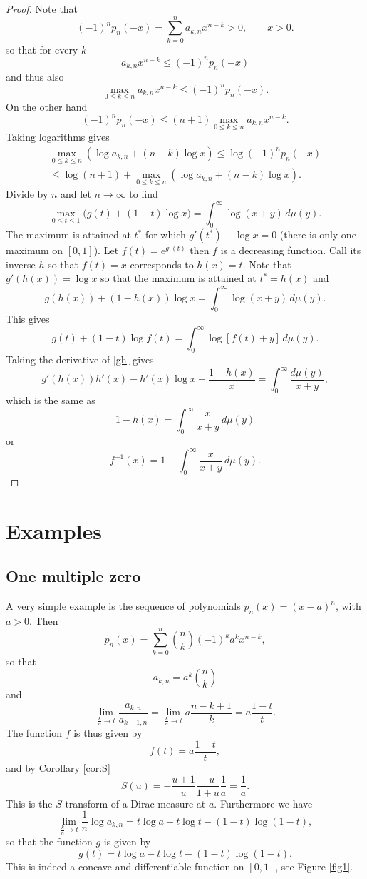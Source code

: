 \documentclass[12pt]{article}
\numberwithin{equation}{section}
\begin{document}
\begin{proof}
Note that 
\[           (-1)^n p_n(-x) = \sum_{k=0}^n a_{k,n} x^{n-k} > 0 , \qquad x > 0.  \]
so that for every $k$
\[                            a_{k,n} x^{n-k} \leq  (-1)^n p_n(-x)     \]
and thus also
\[               \max_{0 \leq k \leq n}     a_{k,n} x^{n-k} \leq  (-1)^n p_n(-x).     \]
On the other hand
\[                                      (-1)^n p_n(-x) \leq (n+1)   \max_{0 \leq k \leq n}     a_{k,n} x^{n-k} .  \]
Taking logarithms gives
\begin{multline*}       
   \max_{0 \leq k \leq n}  \left(  \log a_{k,n} + (n-k) \log x \right)  \leq  \log (-1)^n p_n(-x)  \\
 \leq \log (n+1) +     \max_{0 \leq k \leq n}     \left(\log a_{k,n} + (n-k) \log x \right).  
 \end{multline*}
Divide by $n$ and let $n \to \infty$ to find
\[  \max_{0 \leq t \leq 1} \bigl( g(t) + (1-t) \log x \bigr) = \int_0^\infty \log (x+y) \, d\mu(y).    \]
The maximum is attained at  $t^*$ for which $g'(t^*) - \log x = 0$ (there is only one maximum on $[0,1]$).
Let $f(t) = e^{g'(t)}$ then $f$ is a decreasing function. 
Call its inverse $h$ so that $f(t)=x$ corresponds to $h(x) = t$.
Note that $g'(h(x)) = \log x$ so that the maximum is attained at $t^* = h(x)$ and
\begin{equation}   \label{gh}
        g(h(x)) + (1-h(x)) \log x = \int_0^\infty \log(x+y)\, d\mu(y).  
\end{equation}
This gives
\[     g(t) + (1-t) \log f(t) = \int_0^\infty \log[f(t)+y]\, d\mu(y).   \]
Taking the derivative of \eqref{gh}  gives
\[   g'(h(x)) h'(x) - h'(x) \log x + \frac{1-h(x)}{x} = \int_0^\infty \frac{d\mu(y)}{x+y} , \]
which is the same as
\[       1-h(x) = \int_0^\infty \frac{x}{x+y} \, d\mu(y)    \]
or
\[    f^{-1}(x) = 1-  \int_0^\infty \frac{x}{x+y} \, d\mu(y).  \]
\end{proof}


\section{Examples}
\subsection{One multiple zero}   \label{ex:3.1}
A very simple example is the sequence of polynomials $p_n(x)=(x-a)^n$, with $a>0$. Then
\[   p_n(x) = \sum_{k=0}^n \binom{n}{k} (-1)^k a^k x^{n-k},   \]
so that
\[   a_{k,n} = a^k \binom{n}{k}  \] 
and
\[  \lim_{\frac{k}{n} \to t}   \frac{a_{k,n}}{a_{k-1,n}} = \lim_{\frac{k}{n} \to t} a \frac{n-k+1}{k} = a \frac{1-t}{t}. \]
The function $f$ is thus given by
\[ f(t) = a \frac{1-t}{t}, \]
and by Corollary \ref{cor:S}
\[    S(u) =  - \frac{u+1}{u} \frac{-u}{1+u} \frac{1}{a} = \frac{1}{a}.  \]
This is the $S$-transform of a Dirac measure at $a$.
Furthermore we have
\[    \lim_{\frac{k}{n} \to t} \frac1n \log a_{k,n} = t \log a - t \log t - (1-t) \log(1-t), \]
so that the function $g$ is given by
\[   g(t) = t \log a -t \log t -(1-t) \log(1-t). \]
This is indeed a concave and differentiable function on $[0,1]$, see Figure \ref{fig1}.
\end{document}
